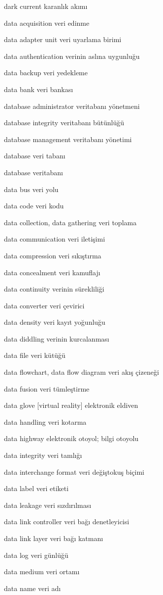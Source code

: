 \documentclass[12pt,fleqn]{article}\usepackage{../../common}
\begin{document}
dark current karanlık akımı

data acquisition veri edinme

data adapter unit veri uyarlama birimi

data authentication verinin aslına uygunluğu

data backup veri yedekleme

data bank veri bankası

database administrator veritabanı yönetmeni

database integrity veritabanı bütünlüğü

database management veritabanı yönetimi

database veri tabanı

database veritabanı

data bus veri yolu

data code veri kodu

data collection, data gathering veri toplama

data communication veri iletişimi

data compression veri sıkıştırma

data concealment veri kamuflajı

data continuity verinin sürekliliği

data converter veri çevirici

data density veri kayıt yoğunluğu

data diddling verinin kurcalanması

data file veri kütüğü

data flowchart, data flow diagram veri akış çizeneği

data fusion veri tümleştirme

data glove [virtual reality] elektronik eldiven

data handling veri kotarma

data highway elektronik otoyol; bilgi otoyolu

data integrity veri tamlığı

data interchange format veri değiştokuş biçimi

data label veri etiketi

data leakage veri sızdırılması

data link controller veri bağı denetleyicisi

data link layer veri bağı katmanı

data log veri günlüğü

data medium veri ortamı

data name veri adı
\end{document}
